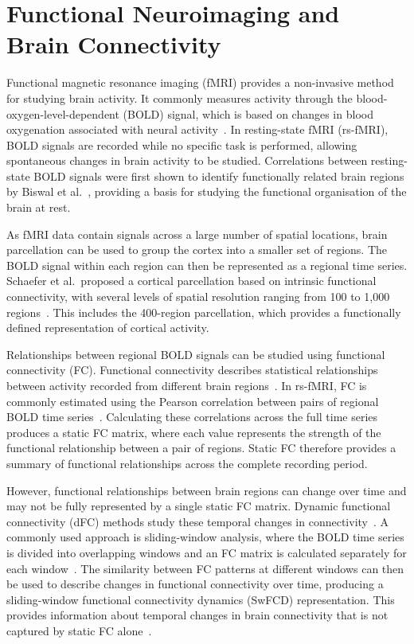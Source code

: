 \section{Functional Neuroimaging and Brain Connectivity}

Functional magnetic resonance imaging (fMRI) provides a non-invasive method for studying brain activity. 
It commonly measures activity through the blood-oxygen-level-dependent (BOLD) signal, which is based on changes in blood oxygenation associated with neural activity~\cite{Ogawa1990}. 
In resting-state fMRI (rs-fMRI), BOLD signals are recorded while no specific task is performed, allowing spontaneous changes in brain activity to be studied. 
Correlations between resting-state BOLD signals were first shown to identify functionally related brain regions by Biswal et al.~\cite{Biswal1995}, providing a basis for studying the functional organisation of the brain at rest.

As fMRI data contain signals across a large number of spatial locations, brain parcellation can be used to group the cortex into a smaller set of regions. 
The BOLD signal within each region can then be represented as a regional time series. 
Schaefer et al.\ proposed a cortical parcellation based on intrinsic functional connectivity, with several levels of spatial resolution ranging from 100 to 1,000 regions~\cite{Schaefer2018}.
This includes the 400-region parcellation, which provides a functionally defined representation of cortical activity.

Relationships between regional BOLD signals can be studied using functional connectivity (FC).
Functional connectivity describes statistical relationships between activity recorded from different brain regions~\cite{Friston1993}. 
In rs-fMRI, FC is commonly estimated using the Pearson correlation between pairs of regional BOLD time series~\cite{Biswal1995}. 
Calculating these correlations across the full time series produces a static FC matrix, where each value represents the strength of the functional relationship between a pair of regions. 
Static FC therefore provides a summary of functional relationships across the complete recording period.

However, functional relationships between brain regions can change over time and may not be fully represented by a single static FC matrix. 
Dynamic functional connectivity (dFC) methods study these temporal changes in connectivity~\cite{Hutchison2013}. 
A commonly used approach is sliding-window analysis, where the BOLD time series is divided into overlapping windows and an FC matrix is calculated separately for each window~\cite{Preti2017}. 
The similarity between FC patterns at different windows can then be used to describe changes in functional connectivity over time, producing a sliding-window functional connectivity dynamics (SwFCD) representation. 
This provides information about temporal changes in brain connectivity that is not captured by static FC alone~\cite{Preti2017}.

